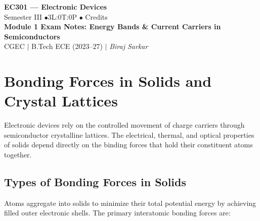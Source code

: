 \documentclass[12pt,a4paper]{article}
\begin{document}

\begin{center}
  {\LARGE\bfseries\color{myred} EC301 --- Electronic Devices}\\[5pt]
  {\normalsize\color{mydark} Semester III \quad$\bullet$\quad 3L:0T:0P \quad$\bullet$ Credits}\\[3pt]
  {\normalsize\color{myteal}\textbf{Module 1 Exam Notes: Energy Bands \& Current Carriers in Semiconductors}}\\[3pt]
  {\small\color{mydark} CGEC \;$|$\; B.Tech ECE (2023--27) \;$|$\; \textit{Biraj Sarkar}}
\end{center}
\vspace{2pt}
\noindent{\color{myred}\rule{\linewidth}{1.5pt}}
\vspace{2pt}

\hypersetup{linkcolor=mydark}
\tableofcontents
\hypersetup{linkcolor=myteal}
\newpage

\section{Bonding Forces in Solids and Crystal Lattices}

Electronic devices rely on the controlled movement of charge carriers through semiconductor crystalline lattices. The electrical, thermal, and optical properties of solids depend directly on the binding forces that hold their constituent atoms together.

\subsection{Types of Bonding Forces in Solids}
Atoms aggregate into solids to minimize their total potential energy by achieving filled outer electronic shells. The primary interatomic bonding forces are:
\end{document}
